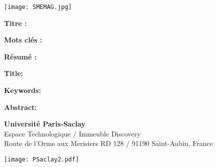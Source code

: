 \pagestyle{empty}

\begin{flushleft}
\texttt{[image: SMEMAG.jpg]}

\vspace{20pt}

\begin{framed}
\textbf{Titre :}

\textbf{Mots clés :}

\textbf{Résumé :}
\end{framed}

\vspace{20pt}

\begin{framed}
\textbf{Title:}

\textbf{Keywords:}

\textbf{Abstract:}
\end{framed}
\end{flushleft}

\vfill

\begin{minipage}[b]{0.6\textwidth}
\small
\color{color02}
\textbf{Université Paris-Saclay} \\
Espace Technologique / Immeuble Discovery  \\
Route de l'Orme aux Merisiers RD 128 / 91190 Saint-Aubin, France
\end{minipage}
\hfill
\begin{minipage}[b]{0.35\textwidth}
\hfill
\texttt{[image: PSaclay2.pdf]}
\end{minipage}

\restoregeometry